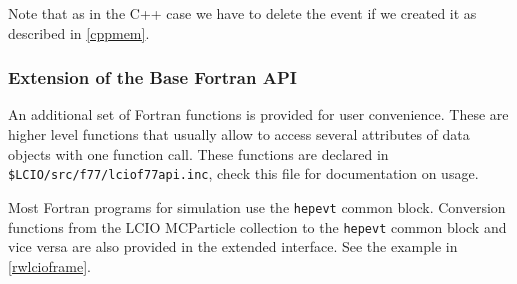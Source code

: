 Note that as in the C++ case we have to delete the event if we created it as described in \ref{cppmem}.



\subsubsection{Extension of the Base Fortran API} \label{f77ext}
An additional set of Fortran functions is provided for user convenience. These are higher level functions
that usually allow to access several attributes of data objects with one function call.
These functions are declared in \verb#$LCIO/src/f77/lciof77api.inc#,
check this file for documentation on usage.

Most Fortran programs for simulation use the \verb$hepevt$ common block. 
Conversion functions from the LCIO MCParticle collection to the \verb$hepevt$ common block and vice versa 
are also provided in the extended interface. See the example in \ref{rwlcioframe}.
